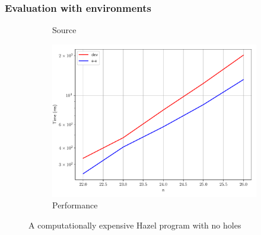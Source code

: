 \documentclass{beamer}
\begin{document}
\begin{frame}[allowframebreaks]
  \frametitle{Evaluation with environments}

  \begin{figure}
    \centering
    \begin{subfigure}[b]{0.45\textwidth}
      \centering
      \tiny
      \caption{Source}
      \label{fig:perf-fib}
    \end{subfigure}
    \qquad
    \begin{subfigure}[b]{0.45\textwidth}
      \includegraphics[width=\textwidth]{thesis/img/perf_fib.pdf}
      \caption{Performance}
      \label{fig:perf-fib-graph}
    \end{subfigure}
    \caption{A computationally expensive Hazel program with no holes}
  \end{figure}


\end{frame}
\end{document}
